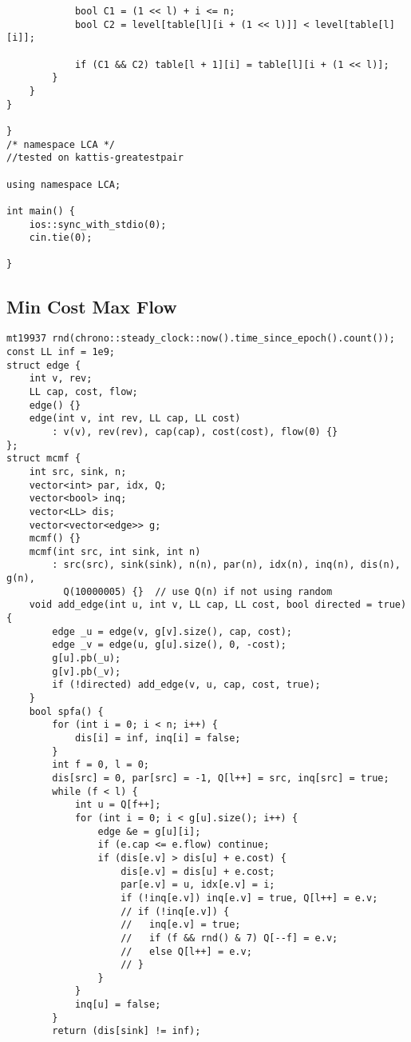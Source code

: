 \documentclass[FSZ,a4paper,onesided]{article}
\begin{document}
\begin{multicols*}{\COLS}
\begin{lstlisting}
            bool C1 = (1 << l) + i <= n;
            bool C2 = level[table[l][i + (1 << l)]] < level[table[l][i]];

            if (C1 && C2) table[l + 1][i] = table[l][i + (1 << l)];
        }
    }
}

} 
/* namespace LCA */
//tested on kattis-greatestpair

using namespace LCA;

int main() {
    ios::sync_with_stdio(0);
    cin.tie(0);

}
\end{lstlisting}
\subsection{Min Cost Max Flow}
\begin{lstlisting}
mt19937 rnd(chrono::steady_clock::now().time_since_epoch().count());
const LL inf = 1e9;
struct edge {
    int v, rev;
    LL cap, cost, flow;
    edge() {}
    edge(int v, int rev, LL cap, LL cost)
        : v(v), rev(rev), cap(cap), cost(cost), flow(0) {}
};
struct mcmf {
    int src, sink, n;
    vector<int> par, idx, Q;
    vector<bool> inq;
    vector<LL> dis;
    vector<vector<edge>> g;
    mcmf() {}
    mcmf(int src, int sink, int n)
        : src(src), sink(sink), n(n), par(n), idx(n), inq(n), dis(n), g(n),
          Q(10000005) {}  // use Q(n) if not using random
    void add_edge(int u, int v, LL cap, LL cost, bool directed = true) {
        edge _u = edge(v, g[v].size(), cap, cost);
        edge _v = edge(u, g[u].size(), 0, -cost);
        g[u].pb(_u);
        g[v].pb(_v);
        if (!directed) add_edge(v, u, cap, cost, true);
    }
    bool spfa() {
        for (int i = 0; i < n; i++) {
            dis[i] = inf, inq[i] = false;
        }
        int f = 0, l = 0;
        dis[src] = 0, par[src] = -1, Q[l++] = src, inq[src] = true;
        while (f < l) {
            int u = Q[f++];
            for (int i = 0; i < g[u].size(); i++) {
                edge &e = g[u][i];
                if (e.cap <= e.flow) continue;
                if (dis[e.v] > dis[u] + e.cost) {
                    dis[e.v] = dis[u] + e.cost;
                    par[e.v] = u, idx[e.v] = i;
                    if (!inq[e.v]) inq[e.v] = true, Q[l++] = e.v;
                    // if (!inq[e.v]) {
                    //   inq[e.v] = true;
                    //   if (f && rnd() & 7) Q[--f] = e.v;
                    //   else Q[l++] = e.v;
                    // }
                }
            }
            inq[u] = false;
        }
        return (dis[sink] != inf);

\end{lstlisting}
\end{multicols*}
\end{document}
